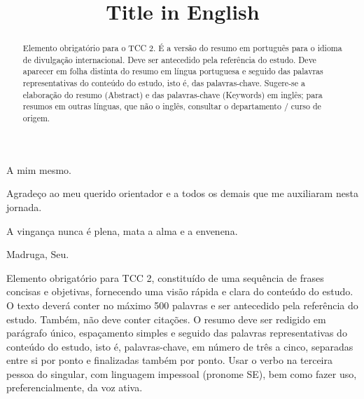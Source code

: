 \documentclass[openright]{normas-utf-tex} %
\title{Title in English} %
\begin{document}
\capa %
\folhaderosto %

\begin{dedicatoria}
A mim mesmo.
\end{dedicatoria}

\begin{agradecimentos}
Agradeço ao meu querido orientador e a todos os demais que me auxiliaram nesta jornada.
\end{agradecimentos}

\begin{epigrafe}
A vingança nunca é plena, mata a alma e a envenena.

Madruga, Seu.
\end{epigrafe}

\begin{resumo}
Elemento obrigatório para TCC 2, constituído de uma sequência de frases concisas e objetivas, fornecendo uma visão rápida e clara do conteúdo do estudo. O texto deverá conter no máximo 500 palavras e ser antecedido pela referência do estudo. Também, não deve conter citações. O resumo deve ser redigido em parágrafo único, espaçamento simples e seguido das palavras representativas do conteúdo do estudo, isto é, palavras-chave, em número de três a cinco, separadas entre si por ponto e finalizadas também por ponto. Usar o verbo na terceira pessoa do singular, com linguagem impessoal (pronome SE), bem como fazer uso, preferencialmente, da voz ativa.
\end{resumo}

\begin{abstract}
Elemento obrigatório para o TCC 2. É a versão do resumo em português para o idioma de divulgação internacional. Deve ser antecedido pela referência do estudo. Deve aparecer em folha distinta do resumo em língua portuguesa e seguido das palavras representativas do conteúdo do estudo, isto é, das palavras-chave. Sugere-se a elaboração do resumo (Abstract) e das palavras-chave (Keywords) em inglês; para resumos em outras línguas, que não o inglês, consultar o departamento / curso de origem.
\end{abstract}

\listadefiguras %
\listadetabelas %
\listadequadros %
\listadesiglas %
\listadesimbolos %
\end{document}

